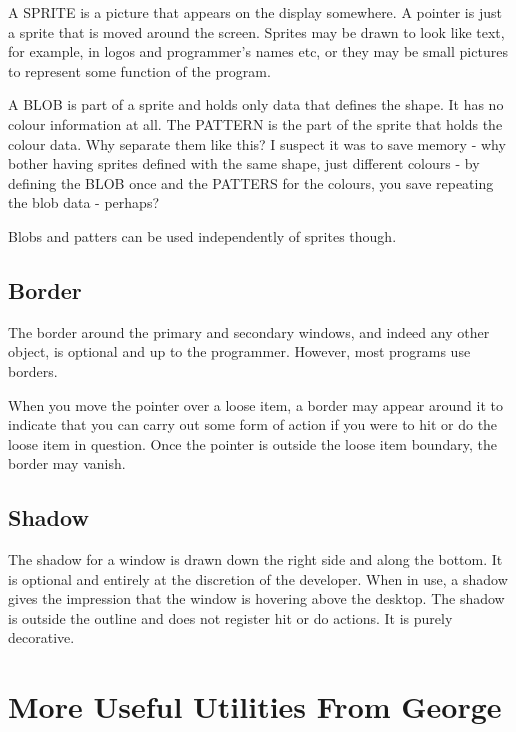 A SPRITE is a picture that appears on the display somewhere. A
      pointer is just a sprite that is moved around the screen. Sprites may be
      drawn to look like text, for example, in logos and programmer's names
      etc, or they may be small pictures to represent some function of the
      program.

A BLOB is part of a sprite and holds only data that defines the
      shape. It has no colour information at all. The PATTERN is the part of
      the sprite that holds the colour data. Why separate them like this? I
      suspect it was to save memory -{} why bother having sprites defined with
      the same shape, just different colours -{} by defining the BLOB once and
      the PATTERS for the colours, you save repeating the blob data -{}
      perhaps?

Blobs and patters can be used independently of sprites
      though.

\subsection{Border}
\label{ch22-border}%

The border around the primary and secondary windows, and indeed
      any other object, is optional and up to the programmer. However, most
      programs use borders.

When you move the pointer over a loose item, a border may appear
      around it to indicate that you can carry out some form of action if you
      were to hit or do the loose item in question. Once the pointer is
      outside the loose item boundary, the border may vanish.

\subsection{Shadow}
\label{ch22-shadow}%

The shadow for a window is drawn down the right side and along the
      bottom. It is optional and entirely at the discretion of the developer.
      When in use, a shadow gives the impression that the window is hovering
      above the desktop. The shadow is outside the outline and does not
      register hit or do actions. It is purely decorative.

\section{More Useful Utilities From George}
\label{ch22-utilities}%

